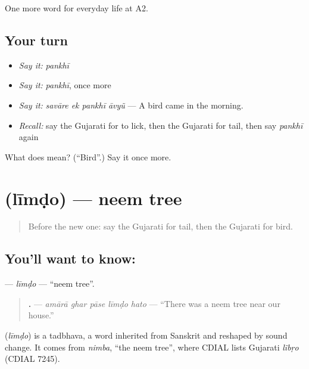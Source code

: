 \begin{grammarlens}[title={What you've built}]
One more word for everyday life at A2.
\end{grammarlens}

\subsection*{Your turn}
\begin{itemize}
\raggedright
  \item \emph{Say it:} \emph{pankhī}
  \item \emph{Say it:} \emph{pankhī}, once more
  \item \emph{Say it:} \emph{savāre ek pankhī āvyũ} — A bird came in the morning.
  \item \emph{Recall:} say the Gujarati for to lick, then the Gujarati for tail, then say \emph{pankhī} again
\end{itemize}

\begin{tcolorbox}[breakable,colback=teal!4,colframe=teal!35!black,title={Before you move on}]
What does  mean? (\textquotedblleft{}Bird\textquotedblright{}.) Say it once more.
\end{tcolorbox}
\section[\texorpdfstring{\gu{લીમડો} (līmḍo)}{લીમડો (līmḍo)}]{ (līmḍo) — neem tree}

\label{lesson:GU-C236-limdo}



\begin{quote}
Before the new one: say the Gujarati for tail, then the Gujarati for bird.
\end{quote}

\subsection*{You'll want to know: }
\textbf{} — \emph{līmḍo} — \textquotedblleft{}neem tree\textquotedblright{}.

\begin{quote}
\textbf{    .} — \emph{amārā ghar pāse līmḍo hato} — \textquotedblleft{}There was a neem tree near our house.\textquotedblright{}
\end{quote}

\begin{cousinweb}
\textbf{} (\emph{līmḍo}) is a tadbhava, a word inherited from Sanskrit and reshaped by sound change. It comes from \emph{nimba}, \textquotedblleft{}the neem tree\textquotedblright{}, where CDIAL lists Gujarati \emph{lĩbṛo} (CDIAL 7245).
\end{cousinweb}

